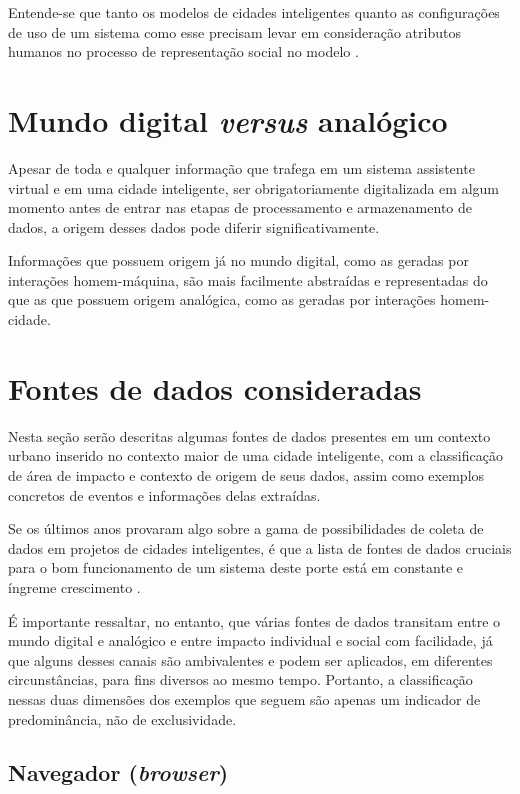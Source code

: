 Entende-se que tanto os modelos de cidades inteligentes quanto as configurações de uso de um sistema como esse precisam levar em consideração atributos humanos no processo de representação social no modelo \cite{huso17}.

\section{Mundo digital \textit{versus} analógico} \label{s:mundo_digital_vs_analogico}

Apesar de toda e qualquer informação que trafega em um sistema assistente virtual e em uma cidade inteligente, ser obrigatoriamente digitalizada em algum momento antes de entrar nas etapas de processamento e armazenamento de dados, a origem desses dados pode diferir significativamente.

Informações que possuem origem já no mundo digital, como as geradas por interações homem-máquina, são mais facilmente abstraídas e representadas do que as que possuem origem analógica, como as geradas por interações homem-cidade.

\section{Fontes de dados consideradas} \label{s:fontes_de_dados_consideradas}

Nesta seção serão descritas algumas fontes de dados presentes em um contexto urbano inserido no contexto maior de uma cidade inteligente, com a classificação de área de impacto e contexto de origem de seus dados, assim como exemplos concretos de eventos e informações delas extraídas.

Se os últimos anos provaram algo sobre a gama de possibilidades de coleta de dados em projetos de cidades inteligentes, é que a lista de fontes de dados cruciais para o bom funcionamento de um sistema deste porte está em constante e íngreme crescimento \cite{lavaprotocols:smartcity}.

É importante ressaltar, no entanto, que várias fontes de dados transitam entre o mundo digital e analógico e entre impacto individual e social com facilidade, já que alguns desses canais são ambivalentes e podem ser aplicados, em diferentes circunstâncias, para fins diversos ao mesmo tempo. Portanto, a classificação nessas duas dimensões dos exemplos que seguem são apenas um indicador de predominância, não de exclusividade.

\subsection{Navegador (\textit{browser})}


